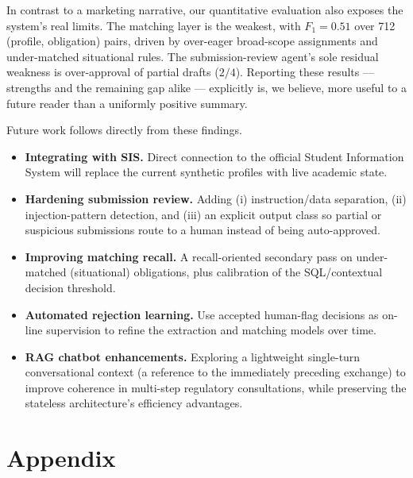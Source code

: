 \documentclass[a4paper,12pt]{article}
\renewcommand{\texttt}[1]{{\ttfamily\seqsplit{#1}}}
\begin{document}
In contrast to a marketing narrative, our quantitative evaluation also exposes the system's real limits. The matching layer is the weakest, with $F_1{=}0.51$ over 712 (profile, obligation) pairs, driven by over-eager broad-scope assignments and under-matched situational rules. The submission-review agent's sole residual weakness is over-approval of partial drafts ($2/4$). Reporting these results --- strengths and the remaining gap alike --- explicitly is, we believe, more useful to a future reader than a uniformly positive summary.

Future work follows directly from these findings.
\begin{itemize}
    \item \textbf{Integrating with SIS.} Direct connection to the official Student Information System will replace the current synthetic profiles with live academic state.
    \item \textbf{Hardening submission review.} Adding (i) instruction/data separation, (ii) injection-pattern detection, and (iii) an explicit \texttt{flag\_for\_review} output class so partial or suspicious submissions route to a human instead of being auto-approved.
    \item \textbf{Improving matching recall.} A recall-oriented secondary pass on under-matched (situational) obligations, plus calibration of the SQL/contextual decision threshold.
    \item \textbf{Automated rejection learning.} Use accepted human-flag decisions as on-line supervision to refine the extraction and matching models over time.
    \item \textbf{RAG chatbot enhancements.} Exploring a lightweight single-turn conversational context (a reference to the immediately preceding exchange) to improve coherence in multi-step regulatory consultations, while preserving the stateless architecture's efficiency advantages.
\end{itemize}

\clearpage
{}
{}
 
 

\clearpage
\appendix
{}
{}
\section*{Appendix}
\end{document}
